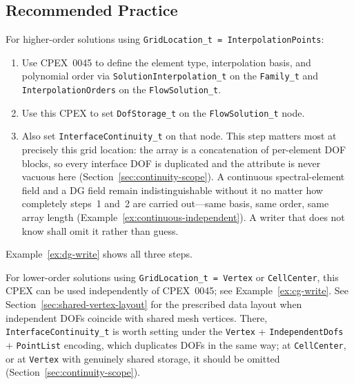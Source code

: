 \documentclass[11pt,letterpaper]{article}
\begin{document}

\subsection{Recommended Practice}

For higher-order solutions using \texttt{GridLocation\_t =
InterpolationPoints}:

\begin{enumerate}[leftmargin=2em]
\item Use CPEX~0045 to define the element type, interpolation basis,
  and polynomial order via \texttt{SolutionInterpolation\_t} on the
  \texttt{Family\_t} and \texttt{InterpolationOrders} on the
  \texttt{FlowSolution\_t}.
\item Use this CPEX to set \texttt{DofStorage\_t} on the
  \texttt{FlowSolution\_t} node.
\item Also set \texttt{InterfaceContinuity\_t} on that node.  This step
  matters most at precisely this grid location: the array is a
  concatenation of per-element DOF blocks, so every interface DOF is
  duplicated and the attribute is never vacuous here
  (Section~\ref{sec:continuity-scope}).  A continuous spectral-element
  field and a DG field remain indistinguishable without it no matter how
  completely steps~1 and~2 are carried out---same basis, same order,
  same array length (Example~\ref{ex:continuous-independent}).  A writer
  that does not know shall omit it rather than guess.
\end{enumerate}

Example~\ref{ex:dg-write} shows all three steps.

For lower-order solutions using \texttt{GridLocation\_t = Vertex} or
\texttt{CellCenter}, this CPEX can be used independently of CPEX~0045;
see Example~\ref{ex:cg-write}.
See Section~\ref{sec:shared-vertex-layout} for the prescribed data
layout when independent DOFs coincide with shared mesh vertices.  There,
\texttt{InterfaceContinuity\_t} is worth setting under the
\texttt{Vertex} + \texttt{IndependentDofs} + \texttt{PointList} encoding,
which duplicates DOFs in the same way; at \texttt{CellCenter}, or at
\texttt{Vertex} with genuinely shared storage, it should be omitted
(Section~\ref{sec:continuity-scope}).
\end{document}
